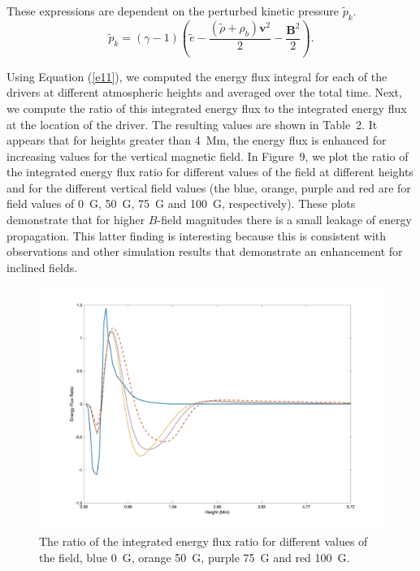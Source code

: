 \documentclass[physics,article,submit,pdftex,moreauthors]{Definitions/mdpi}
\begin{document}
These expressions are dependent on the perturbed kinetic pressure $\tilde{p}_{k}$.
$$
\tilde{p}_{k}=\left(\gamma - 1\right)\left( \tilde{e}-\frac{ \left( \tilde{\rho} +\rho_b \right){\mathbf v}^2}{2}-\frac{{\mathbf B}^2}{2}\right).
$$


Using Equation (\ref{e11}), we computed the energy flux integral for each of the drivers at different atmospheric heights and averaged over the total time. Next, we compute the ratio of this integrated energy flux to the integrated energy flux at the location of the driver. The resulting values are shown in Table~2. It appears that for heights greater than 4~Mm, the energy flux is enhanced for increasing values for the vertical magnetic field. In Figure~9,
we plot the ratio of the integrated energy flux ratio for different values of the field at different heights and for the different vertical field values (the blue, orange, purple and red  are for field values of 0~G, 50~G, 75~G and 100~G, respectively). These plots demonstrate that for higher $B$-field magnitudes there is a small leakage of energy propagation. This latter finding is interesting because this is consistent with observations and other simulation results that demonstrate an enhancement for inclined fields.


\begin{figure}
    \label{energyfluxratio_50G_75G_100G_line}
    \centering
    \includegraphics[scale=0.06]{energyfluxratio.jpg}
    \caption{The ratio of the integrated energy flux ratio for different values of the field, blue 0~G, orange 50~G, purple 75~G and red 100~G.}
\end{figure}
\end{document}
